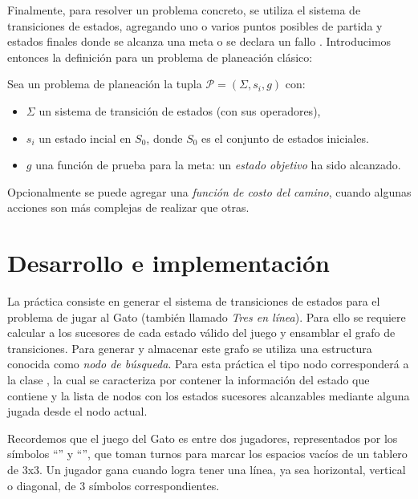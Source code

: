 Finalmente, para resolver un problema concreto, se utiliza el sistema de transiciones de estados, agregando uno o varios puntos posibles de partida y estados finales donde se alcanza una meta o se declara un fallo  .  Introducimos entonces la definición para un problema de planeación clásico:


 \begin{definition}
  Sea un problema de planeación la tupla $\mathcal{P} = (\Sigma, s_i,g)$ con:

  \begin{itemize}
   \item $\Sigma$ un sistema de transición de estados (con sus operadores),
   \item $s_i$ un estado incial en $S_0$, donde $S_0$ es el conjunto de estados iniciales.
   \item $g$ una función de prueba para la meta: un \emph{estado objetivo} ha sido alcanzado.
  \end{itemize}
  \parencite{Ghallab2004}
 \end{definition}

 Opcionalmente se puede agregar una \emph{función de costo del camino}, cuando algunas acciones son más complejas de realizar que otras.



\section{Desarrollo e implementaci\'on}

La práctica consiste en generar el sistema de transiciones de estados para el problema de jugar al Gato (también llamado \textit{Tres en línea}).  Para ello se requiere calcular a los sucesores de cada estado válido del juego y ensamblar el grafo de transiciones.  Para generar y almacenar este grafo se utiliza una estructura conocida como \emph{nodo de búsqueda}.  Para esta práctica el tipo nodo corresponderá a la clase , la cual se caracteriza por contener la información del estado que contiene y la lista de nodos con los estados sucesores alcanzables mediante alguna jugada desde el nodo actual.

Recordemos que el juego del Gato es entre dos jugadores, representados por los símbolos \enquote{} y \enquote{}, que toman turnos para marcar los espacios vacíos de un tablero de 3x3.
Un jugador gana cuando logra tener una línea, ya sea horizontal, vertical o diagonal, de 3 símbolos correspondientes. 

